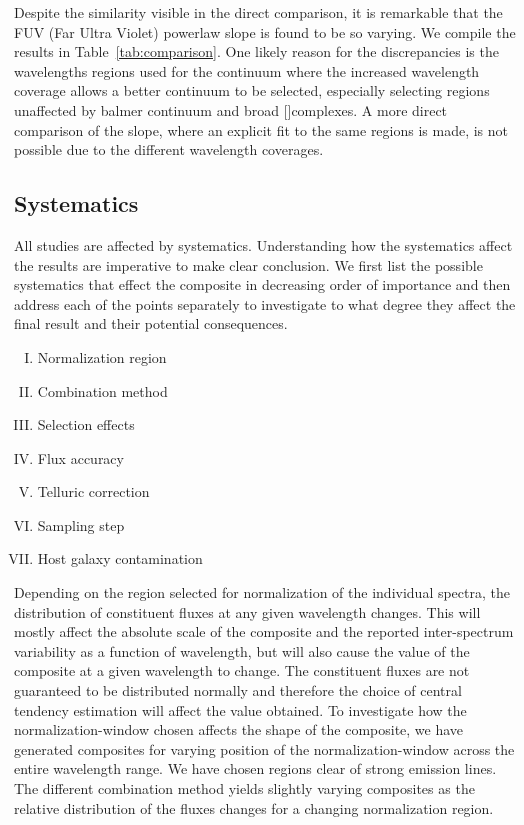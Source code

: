 \documentclass{aa}    %
\newcommand{\Tab}[1]{Table~\ref{tab:#1}}
\newcommand{\tab}[1]{\Tab{#1}}
\newcommand{\sectlabel}[1]{\label{sect:#1}}
\newcommand{\feii}{[\ion{Fe}{ii}]}
\begin{document}
Despite the similarity visible in the direct comparison, it is remarkable that the FUV (Far Ultra Violet) powerlaw slope is found to be so varying. We compile the results in \tab{comparison}. One likely reason for the discrepancies is the wavelengths regions used for the continuum where the increased wavelength coverage allows a better continuum to be selected, especially selecting regions unaffected by balmer continuum and broad \feii complexes. A more direct comparison of the slope, where an explicit fit to the same regions is made, is not possible due to the different wavelength coverages. 





\subsection{Systematics}  \sectlabel{systematics}

All studies are affected by systematics. Understanding how the systematics affect the results are imperative to make clear conclusion. We first list the possible systematics that effect the composite in decreasing order of importance and then address each of the points separately to investigate to what degree they affect the final result and their potential consequences.


\begin{enumerate}[(I)]
	\item Normalization region
	\item Combination method
	\item Selection effects
	\item Flux accuracy
	\item Telluric correction
	\item Sampling step
	\item Host galaxy contamination
\end{enumerate}




Depending on the region selected for normalization of the individual spectra, the distribution of constituent fluxes at any given wavelength changes. This will mostly affect the absolute scale of the composite and the reported inter-spectrum variability as a function of wavelength, but will also cause the value of the composite at a given wavelength to change. The constituent fluxes are not guaranteed to be distributed normally and therefore the choice of central tendency estimation will affect the value obtained. To investigate how the normalization-window chosen affects the shape of the composite, we have generated composites for varying position of the normalization-window across the entire wavelength range. We have chosen regions clear of strong emission lines. The different combination method yields slightly varying composites as the relative distribution of the fluxes changes for a changing normalization region.
\end{document}
